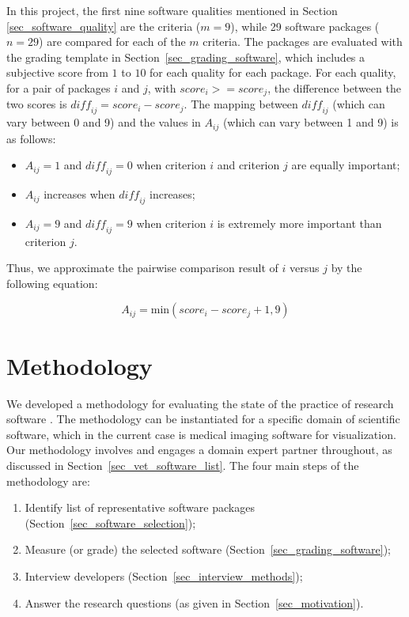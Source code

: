 \documentclass[final, 3p, times, authoryear]{elsarticle}
\begin{document}
In this project, the first nine software qualities mentioned in Section
\ref{sec_software_quality} are the criteria ($m = 9$), while 29 software
packages ($n = 29$) are compared for each of the $m$ criteria. The packages are
evaluated with the grading template in Section~\ref{sec_grading_software}, which
includes a subjective score from $1$ to $10$ for each quality for each package.
For each quality, for a pair of packages $i$ and $j$, with $\mathit{score}_i >=
\mathit{score}_j$, the difference between the two scores is $\mathit{diff_{ij}}
= \mathit{score}_i - \mathit{score}_j$. The mapping between $\mathit{diff_{ij}}$
(which can vary between 0 and 9) and the values in $A_{ij}$ (which can vary
between 1 and 9) is as follows:

\begin{itemize}
\item $A_{ij} = 1$ and $\mathit{diff_{ij}} = 0$ when criterion $i$ and criterion
$j$ are equally important;
\item $A_{ij}$ increases when $\mathit{diff_{ij}}$ increases;
\item $A_{ij} = 9$ and $\mathit{diff_{ij}} = 9$ when criterion $i$ is extremely
more important than criterion $j$.
\end{itemize}

\noindent Thus, we approximate the pairwise comparison result of $i$ versus $j$
by the following equation:

\begin{equation}
A_{ij} = \text{min}(\mathit{score}_i - \mathit{score}_j + 1, 9)
\end{equation}

\section{Methodology} \label{ch_methods}

We developed a methodology for evaluating the state of the practice of research
software \citep{SmithEtAl2021}.  The methodology can be instantiated for a
specific domain of scientific software, which in the current case is medical
imaging software for visualization.  Our methodology involves and engages a
domain expert partner throughout, as discussed in
Section~\ref{sec_vet_software_list}.  The four main steps of the methodology
are:

\begin{enumerate}
\item Identify list of representative software packages
(Section~\ref{sec_software_selection});
\item Measure (or grade) the selected software
(Section~\ref{sec_grading_software});
\item Interview developers (Section~\ref{sec_interview_methods});
\item Answer the research questions (as given in Section~\ref{sec_motivation}).
\end{enumerate}
\end{document}
